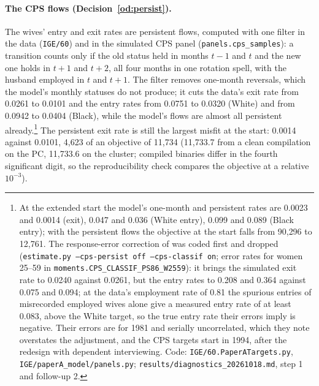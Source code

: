 \documentclass[11pt]{article}
\newcommand{\code}[1]{\texttt{#1}}
\newcommand{\1}{\mathbf{1}}
\begin{document}
\paragraph{The CPS flows (Decision~\ref{od:persist}).} The wives' entry and exit rates are persistent flows, computed
with one filter in the data (\code{IGE/60}) and in the simulated CPS panel (\code{panels.cps\_samples}): a transition
counts only if the old status held in months $t-1$ and $t$ and the new one holds in $t+1$ and $t+2$, all four months in
one rotation spell, with the husband employed in $t$ and $t+1$. The filter removes one-month reversals, which the model's
monthly statuses do not produce; it cuts the data's exit rate from 0.0261 to 0.0101 and the entry rates from 0.0751 to
0.0320 (White) and from 0.0942 to 0.0404 (Black), while the model's flows are almost all persistent
already.\footnote{At the extended start the model's one-month and persistent rates are 0.0023 and 0.0014 (exit), 0.047
and 0.036 (White entry), 0.099 and 0.089 (Black entry); with the persistent flows the objective at the start falls from
90{,}296 to 12{,}761. The response-error correction of \citet{poterba1986reporting} was coded first and dropped
(\code{estimate.py --cps-persist off --cps-classif on}; error rates for women 25--59 in
\code{moments.CPS\_CLASSIF\_PS86\_W2559}): it brings the simulated exit rate to 0.0240 against 0.0261, but the entry
rates to 0.208 and 0.364 against 0.075 and 0.094; at the data's employment rate of 0.81 the spurious entries of
misrecorded employed wives alone give a measured entry rate of at least 0.083, above the White target, so the true entry
rate their errors imply is negative. Their errors are for 1981 and serially uncorrelated, which they note overstates the
adjustment, and the CPS targets start in 1994, after the redesign with dependent interviewing. Code:
\code{IGE/60.PaperATargets.py}, \code{IGE/paperA\_model/panels.py}; \code{results/diagnostics\_20261018.md}, step 1 and
follow-up 2.} The persistent exit rate is still the largest misfit at the start: 0.0014 against 0.0101, 4{,}623 of an
objective of 11{,}734 (11{,}733.7 from a clean compilation on the PC, 11{,}733.6 on the cluster; compiled binaries
differ in the fourth significant digit, so the reproducibility check compares the objective at a relative $10^{-3}$).
\end{document}
